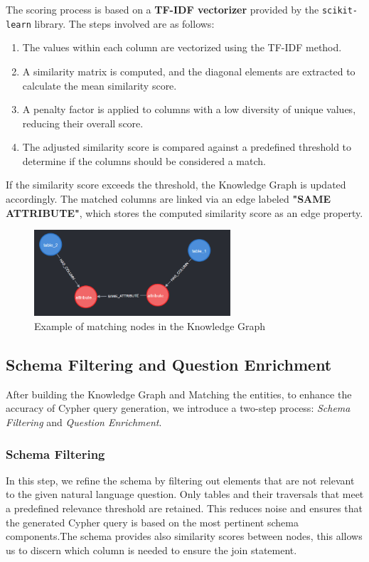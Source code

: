The scoring process is based on a \textbf{TF-IDF vectorizer} provided by the \texttt{scikit-learn} library. The steps involved are as follows:

\begin{enumerate}
    \item The values within each column are vectorized using the TF-IDF method.
    \item A similarity matrix is computed, and the diagonal elements are extracted to calculate the mean similarity score.
    \item A penalty factor is applied to columns with a low diversity of unique values, reducing their overall score.
    \item The adjusted similarity score is compared against a predefined threshold to determine if the columns should be considered a match.
\end{enumerate}

If the similarity score exceeds the threshold, the Knowledge Graph is updated accordingly. The matched columns are linked via an edge labeled \textbf{"SAME ATTRIBUTE"}, which stores the computed similarity score as an edge property.
\begin{figure}[h]
    \centering
\includegraphics[width=0.65\textwidth]{IMAGES/immagine_2025-03-27_154727649.png}
    \caption{Example of matching nodes in the Knowledge Graph}
    \label{fig:Matching Nodes}
\end{figure}

\subsection{Schema Filtering and Question Enrichment}

After building the Knowledge Graph and Matching the entities, to enhance the accuracy of Cypher query generation, we introduce a two-step process: \textit{Schema Filtering} and \textit{Question Enrichment}.

\subsubsection{Schema Filtering}  
In this step, we refine the schema by filtering out elements that are not relevant to the given natural language question. Only tables and their traversals that meet a predefined relevance threshold are retained. This reduces noise and ensures that the generated Cypher query is based on the most pertinent schema components.The schema provides also similarity scores between nodes, this allows us to discern which column is needed to ensure the join statement.


